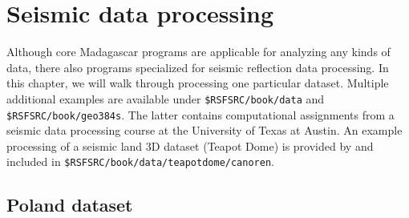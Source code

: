\chapter{Seismic data processing}

Although core Madagascar programs are applicable for analyzing any
kinds of data, there also programs specialized for seismic reflection
data processing. In this chapter, we will walk through processing one
particular dataset. Multiple additional examples are available under
\texttt{\$RSFSRC/book/data} and \texttt{\$RSFSRC/book/geo384s}. The
latter contains computational assignments from a seismic data
processing course at the University of Texas at Austin. An example
processing of a seismic land 3D dataset (Teapot Dome) is provided by
\cite{oren2018overview} and included in
\texttt{\$RSFSRC/book/data/teapotdome/canoren}.

\section{Poland dataset}




